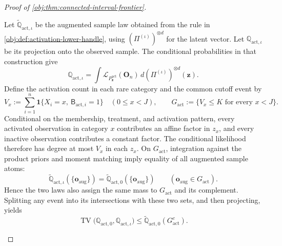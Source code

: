 \documentclass[11pt]{article}
\begin{document}
\begin{proof}[Proof of \cref{obj:thm:connected-interval-frontier}]
\begin{enumerate}
Let \(\widetilde{\mathbb Q}_{\mathrm{act},\iota}\) be the augmented
sample law obtained from the rule in
\cref{obj:def:activation-lower-handle}, using
\((\Pi^{(\iota)})^{\otimes d}\) for the latent vector. Let
\(\mathbb Q_{\mathrm{act},\iota}\) be its projection onto the observed
sample. The conditional probabilities in that construction give
\[
\mathbb Q_{\mathrm{act},\iota}
=
\int
\mathcal L_{P^{\mathrm{act}}_{\mathbf z}}(\mathbf O_n)\,
d(\Pi^{(\iota)})^{\otimes d}(\mathbf z).
\]
Define the activation count in each rare category and the common cutoff
event by
\[
V_x:=\sum_{i=1}^n
\mathbf1\{X_i=x,\ \mathsf B_{\mathrm{act},i}=1\}
\quad(0\le x<J),
\qquad
G_{\mathrm{act}}:=\{V_x\le K\text{ for every }x<J\}.
\]
Conditional on the membership, treatment, and activation pattern, every
activated observation in category \(x\) contributes an affine factor in
\(z_x\), and every inactive observation contributes a constant factor.
The conditional likelihood therefore has degree at most \(V_x\) in each
\(z_x\). On \(G_{\mathrm{act}}\), integration against the product priors
and moment matching imply equality of all augmented sample atoms:
\[
\widetilde{\mathbb Q}_{\mathrm{act},\iota}(\{\mathbf o_{\mathrm{aug}}\})
=
\widetilde{\mathbb Q}_{\mathrm{act},0}(\{\mathbf o_{\mathrm{aug}}\})
\qquad(\mathbf o_{\mathrm{aug}}\in G_{\mathrm{act}}).
\]
Hence the two laws also assign the same mass to \(G_{\mathrm{act}}\)
and its complement. Splitting any event into its intersections with
these two sets, and then projecting, yields
\[
\operatorname{TV}
\bigl(\mathbb Q_{\mathrm{act},0},
      \mathbb Q_{\mathrm{act},\iota}\bigr)
\le
\widetilde{\mathbb Q}_{\mathrm{act},0}(G_{\mathrm{act}}^c).
\]


\end{enumerate}
\end{proof}
\end{document}
